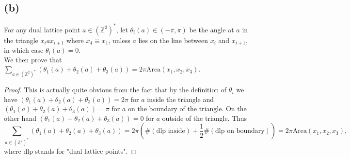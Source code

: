 \documentclass[a4paper,11pt]{article}
\newcommand{\Z}{\mathbb{Z}}
\newcommand{\Area}{\text{Area}}
\numberwithin{equation}{section}
\begin{document}
	\subsection*{(b)}
	For any dual lattice point $ a\in(\Z^2)^* $, let $ \theta_i(a)\in(-\pi,\pi) $ be the angle at $ a $ in the triangle $ x_iax_{i+1} $ where $ x_4\equiv x_1 $, unless $ a $ lies on the line between $ x_i $ and $ x_{i+1} $, in which case $ \theta_i(a)=0 $.\\
	We then prove that $ \sum_{a\in(\Z^2)^*}\left(\theta_1(a)+\theta_2(a)+\theta_3(a)\right)=2\pi\Area(x_1,x_2,x_3) $. \begin{proof}
		This is actually quite obvious from the fact that by the definition of $ \theta_i $ we have $ (\theta_1(a)+\theta_2(a)+\theta_3(a))=2\pi $ for $ a $ inside the triangle and $ (\theta_1(a)+\theta_2(a)+\theta_3(a))=\pi $ for $ a $ on the boundary of the triangle. On the other hand $ (\theta_1(a)+\theta_2(a)+\theta_3(a))=0 $ for $ a $ outside of the triangle. Thus \begin{equation}
		\sum_{a\in(\Z^2)^*}\left(\theta_1(a)+\theta_2(a)+\theta_3(a)\right)=2\pi\left(\#(\text{dlp inside})+\frac{1}{2}\#(\text{dlp on boundary})\right)=2\pi\Area(x_1,x_2,x_3),
		\end{equation}
		where dlp stands for "dual lattice points".
	\end{proof} 
\end{document}
